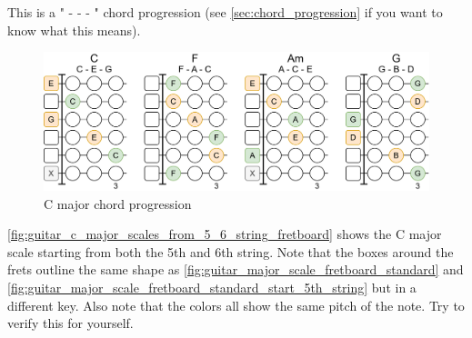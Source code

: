 This is a " -  -  - " chord progression (see \autoref{sec:chord_progression} if you want to know what this means).

\begin{figure}[h]
	\centering
	\includegraphics[height=0.19\textheight]{../../Images/CMajor_chord_progression.png}
	\caption{C major chord progression}
	\label{fig:c_major_chord_progression}
\end{figure}

\autoref{fig:guitar_c_major_scales_from_5_6_string_fretboard} shows the C major scale starting from both the 5th and 6th string. Note that the boxes around the frets outline the same shape as \autoref{fig:guitar_major_scale_fretboard_standard} and \autoref{fig:guitar_major_scale_fretboard_standard_start_5th_string} but in a different key. Also note that the colors all show the same pitch of the note. Try to verify this for yourself.

